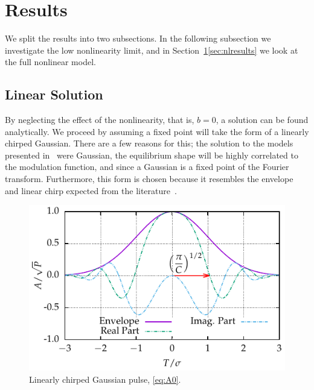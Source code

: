 \documentclass[9pt,twocolumn,twoside]{osajnl}
\begin{document}
\section{Results}
\label{sec:results}
We split the results into two subsections. In the following subsection we investigate the low nonlinearity limit, and in Section~\ref{sec:results}\ref{sec:nlresults} we look at the full nonlinear model.

\subsection{Linear Solution}
By neglecting the effect of the nonlinearity, that is, $b = 0$, a solution can be found analytically. We proceed by assuming a fixed point will take the form of a linearly chirped Gaussian. There are a few reasons for this; the solution to the models presented in~\cite{cutler1955, siegman1969, kuizenga1970a, martinez1984, martinez1985} were Gaussian, the equilibrium shape will be highly correlated to the modulation function, and since a Gaussian is a fixed point of the Fourier transform. Furthermore, this form is chosen because it resembles the envelope and linear chirp expected from the literature~\cite{burgoyne2014, haus1975, haus1996, haus2000, usechak2005}.

\begin{figure}[tbp]
	\centering
	\includegraphics{Figures/Sample_Gauss}
	\caption{Linearly chirped Gaussian pulse, \eqref{eq:A0}.}
	\label{fig:samplegauss}
\end{figure}
\end{document}
